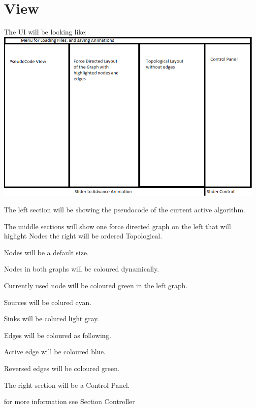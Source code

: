 \section{View}
The UI will be looking like: \\
\includegraphics[width=\textwidth]{parts/UIFinished}
\begin{list}{-}{}
\item The left section will be showing the pseudocode of the current active algorithm.
\item The middle sections will show one force directed  graph on the left that will higlight Nodes the right will be ordered Topological.

\item Nodes will be a default size.
\item Nodes in both graphs will be coloured dynamically.
\begin{list}{-}{}
\item Currently used node will be coloured green in the left graph.
\item Sources will be colured cyan.
\item Sinks will be colured light gray.
\end{list}
\item Edges will be coloured as following.
\begin{list}{-}{}
\item Active edge will be coloured blue.
\item Reversed edges will be coloured green.
\end{list}
\item The right section will be a Control Panel.
\begin{list}{-}{}
\item for more information see Section Controller

\end{list}
\end{list}




